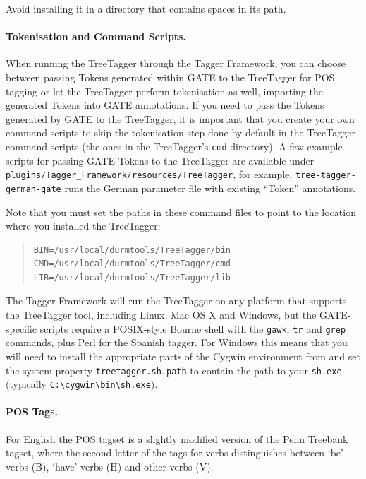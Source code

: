 
Avoid installing it in a directory that contains spaces in its path.

\paragraph{Tokenisation and Command Scripts.} 
When running the TreeTagger through the Tagger Framework, you can
choose between passing Tokens generated within GATE to the TreeTagger
for POS tagging or let the TreeTagger perform tokenisation as well,
importing the generated Tokens into GATE annotations. If you need to
pass the Tokens generated by GATE to the TreeTagger, it is important
that you create your own command scripts to skip the tokenisation step
done by default in the TreeTagger command scripts (the ones in the
TreeTagger's \verb|cmd| directory). A few example scripts for passing
GATE Tokens to the TreeTagger are available under
\verb|plugins/Tagger_Framework/resources/TreeTagger|, for example,
\verb|tree-tagger-german-gate| runs the German parameter file with
existing ``Token'' annotations.

Note that you must set the paths in these command files to point to
the location where you installed the TreeTagger:
\begin{quote}
 \begin{small}
 \begin{verbatim}
BIN=/usr/local/durmtools/TreeTagger/bin
CMD=/usr/local/durmtools/TreeTagger/cmd
LIB=/usr/local/durmtools/TreeTagger/lib
\end{verbatim}
\end{small}
\end{quote}
The Tagger Framework will run the TreeTagger on any platform that
supports the TreeTagger tool, including Linux, Mac OS X and Windows,
but the GATE-specific scripts require a POSIX-style Bourne shell with
the \texttt{gawk}, \texttt{tr} and \texttt{grep} commands, plus Perl
for the Spanish tagger.  For Windows this means that you will need to
install the appropriate parts of the Cygwin environment from
 and set the system property
\texttt{treetagger.sh.path} to contain the path to your
\texttt{sh.exe} (typically \verb|C:\cygwin\bin\sh.exe|).

\paragraph{POS Tags.}
For English the POS tagset is a slightly modified version of the Penn Treebank
tagset, where the second letter of the tags for verbs distinguishes between `be'
verbs (B), `have' verbs (H) and other verbs (V).


